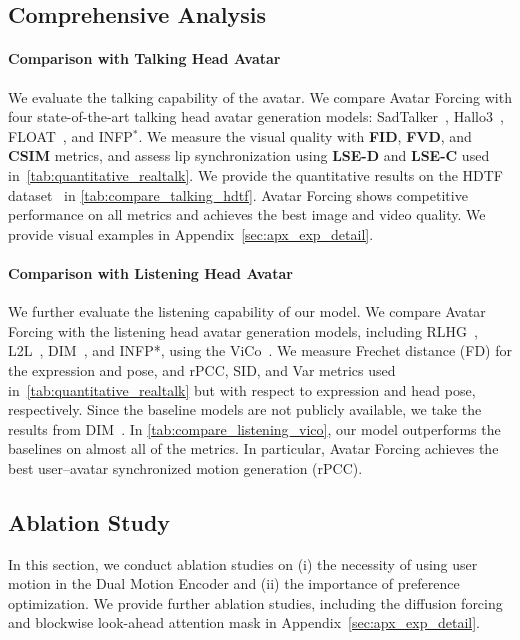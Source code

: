 \subsection{Comprehensive Analysis}
\paragraph{Comparison with Talking Head Avatar}
We evaluate the talking capability of the avatar. 
We compare Avatar Forcing with four state-of-the-art talking head avatar generation models:
SadTalker~\citep{sadtalker}, Hallo3~\citep{hallo3}, FLOAT~\citep{float}, and INFP$^*$. We measure the visual quality with \textbf{FID}, \textbf{FVD}, and \textbf{CSIM} metrics, and assess lip synchronization using \textbf{LSE-D} and \textbf{LSE-C} used in~\cref{tab:quantitative_realtalk}. We provide the quantitative results on the HDTF dataset~\citep{hdtf} in \cref{tab:compare_talking_hdtf}.
Avatar Forcing shows competitive performance on all metrics and achieves the best image and video quality. 
We provide visual examples in Appendix~\ref{sec:apx_exp_detail}.

\vspace{-0.075in}
\paragraph{Comparison with Listening Head Avatar}
We further evaluate the listening capability of our model. We compare Avatar Forcing with the listening head avatar generation models, including RLHG~\citep{rlhg}, L2L~\citep{l2l}, DIM~\citep{dim}, and INFP*, using the ViCo~\citep{rlhg}. 
We measure Frechet distance (FD) for the expression and pose, and rPCC, SID, and Var metrics used in~\cref{tab:quantitative_realtalk} but with respect to expression and head pose, respectively.
Since the baseline models are not publicly available, we take the results from DIM~\citep{dim}.
In \cref{tab:compare_listening_vico}, our model outperforms the baselines on almost all of the metrics. In particular, Avatar Forcing achieves the best user–avatar synchronized motion generation (rPCC).



\subsection{Ablation Study} \label{sec:experiments:ablation}
In this section, we conduct ablation studies on (i) the necessity of using user motion in the Dual Motion Encoder and (ii) the importance of preference optimization. We provide further ablation studies, including the diffusion forcing and blockwise look-ahead attention mask in Appendix~\ref{sec:apx_exp_detail}.


